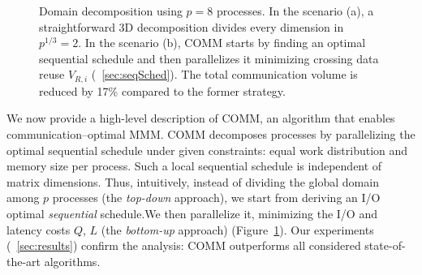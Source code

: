 \documentclass[sigplan,review,anonymous,10pt]{acmart}\settopmatter{printfolios=true,printccs=false,printacmref=false}
\begin{document}
\begin{figure}[!tbp]
	\centering
	\hfill
	\vspace{-1em}
	\caption{Domain decomposition
		using $p=8$  processes. In the scenario (a), a straightforward 3D 
		decomposition
		divides every dimension in $p^{1/3}=2$. In the scenario (b), COMM 
		starts by
		finding an optimal sequential schedule and then parallelizes it 
		minimizing
		crossing data reuse $V_{R,i}$ (~\cref{sec:seqSched}). The total 
		communication volume is reduced by 17\%
		compared to the former strategy.}
	\label{fig:topdown-vs-bottomup}
\end{figure}

We now provide a high-level description of COMM, an algorithm that enables 
communication--optimal MMM.
COMM  decomposes processes by parallelizing the optimal sequential schedule
under given constraints: equal work distribution and memory size per process.
Such a local sequential schedule is independent of matrix dimensions.  Thus,
intuitively, instead of dividing  the global domain among $p$ processes (the
\emph{top-down} approach), we start from deriving an I/O optimal
\emph{sequential} schedule.We then parallelize it, minimizing the I/O and
latency costs $Q$, $L$ (the \emph{bottom-up} approach)
(Figure~\ref{fig:topdown-vs-bottomup}).
Our experiments 
(~\cref{sec:results}) confirm the analysis: COMM outperforms
all considered state-of-the-art algorithms.
\end{document}
